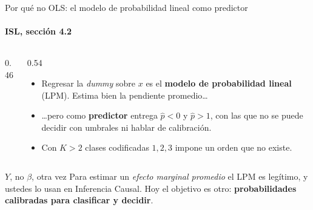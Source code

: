 \documentclass{beamer}
\newcommand{\1}{\mathbb{I}}
\begin{document}
\begin{frame}{Por qué no OLS: el modelo de probabilidad lineal como predictor}
\framesubtitle{ISL, sección 4.2}
\small
\begin{columns}[T]
\begin{column}{0.46\textwidth}
\begin{center}
\end{center}
\end{column}
\begin{column}{0.54\textwidth}
\vspace{0.05cm}
\begin{itemize}\itemsep3pt
  \item Regresar la \emph{dummy} sobre $x$ es el \textbf{modelo de probabilidad lineal} (LPM). Estima bien la pendiente promedio\ldots
  \item \ldots pero como \textbf{predictor} entrega $\hat{p} < 0$ y $\hat{p} > 1$, con las que no se puede decidir con umbrales ni hablar de calibración.
  \item Con $K > 2$ clases codificadas $1, 2, 3$ impone un orden que no existe.
\end{itemize}
\end{column}
\end{columns}
\pause
\begin{block}{$Y$, no $\beta$, otra vez}
Para estimar un \emph{efecto marginal promedio} el LPM es legítimo, y ustedes lo usan en Inferencia Causal. Hoy el objetivo es otro: \textbf{probabilidades calibradas para clasificar y decidir}.
\end{block}
\end{frame}
\end{document}
